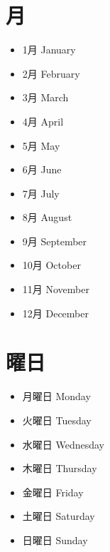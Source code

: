 \documentclass[10pt]{jsarticle}
\newcommand{\answer}[2]{{\color{orange}#2}}
\newcommand{\answer}[2]{\vspace{#1mm}}
\begin{document}
\section{月}
\begin{screen}
  \begin{multicols}{4}
    \begin{itemize}
      \item 1月 \answer{5}{January}
      \item 2月 \answer{5}{February}
      \item 3月 \answer{5}{March}
      \item 4月 \answer{5}{April}
      \item 5月 \answer{5}{May}
      \item 6月 \answer{5}{June}
      \item 7月 \answer{5}{July}
      \item 8月 \answer{5}{August}
      \item 9月 \answer{5}{September}
      \item 10月 \answer{5}{October}
      \item 11月 \answer{5}{November}
      \item 12月 \answer{5}{December}
    \end{itemize}
  \end{multicols}
\end{screen}


\section{曜日}
\begin{screen}
  \begin{multicols}{4}
    \begin{itemize}
      \item 月曜日 \answer{5}{Monday}
      \item 火曜日 \answer{5}{Tuesday}
      \item 水曜日 \answer{5}{Wednesday}
      \item 木曜日 \answer{5}{Thursday}
      \item 金曜日 \answer{5}{Friday}
      \item 土曜日 \answer{5}{Saturday}
      \item 日曜日 \answer{5}{Sunday}
    \end{itemize}
  \end{multicols}
\end{screen}
\end{document}
